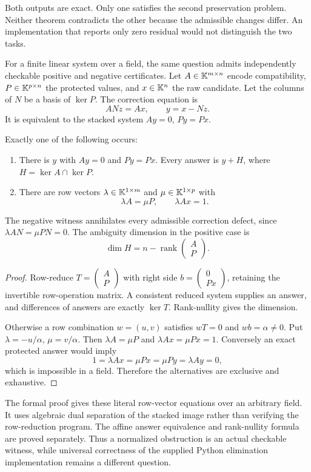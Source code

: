 Both outputs are exact. Only one satisfies the second preservation problem. Neither theorem contradicts the other because the admissible changes differ. An implementation that reports only zero residual would not distinguish the two tasks.

For a finite linear system over a field, the same question admits independently checkable positive and negative certificates. Let \(A\in\mathbb K^{m\times n}\) encode compatibility, \(P\in\mathbb K^{p\times n}\) the protected values, and \(x\in\mathbb K^n\) the raw candidate. Let the columns of \(N\) be a basis of \(\ker P\). The correction equation is
\[
 ANz=Ax,\qquad y=x-Nz.
\]
It is equivalent to the stacked system \(Ay=0\), \(Py=Px\).

\begin{proposition}\label{KS57}
Exactly one of the following occurs:
\begin{enumerate}
\item There is \(y\) with \(Ay=0\) and \(Py=Px\). Every answer is \(y+H\), where \(H=\ker A\cap\ker P\).
\item There are row vectors \(\lambda\in\mathbb K^{1\times m}\) and \(\mu\in\mathbb K^{1\times p}\) with
\[
 \lambda A=\mu P,\qquad\lambda Ax=1.
\]
\end{enumerate}
The negative witness annihilates every admissible correction defect, since \(\lambda AN=\mu PN=0\). The ambiguity dimension in the positive case is
\[
 \dim H=n-\operatorname{rank}\begin{pmatrix}A\\P\end{pmatrix}.
\]
\end{proposition}
\begin{proof}
Row-reduce \(T=\begin{pmatrix}A\\P\end{pmatrix}\) with right side \(b=\begin{pmatrix}0\\Px\end{pmatrix}\), retaining the invertible row-operation matrix. A consistent reduced system supplies an answer, and differences of answers are exactly \(\ker T\). Rank-nullity gives the dimension.

Otherwise a row combination \(w=(u,v)\) satisfies \(wT=0\) and \(wb=\alpha\ne0\). Put \(\lambda=-u/\alpha\), \(\mu=v/\alpha\). Then \(\lambda A=\mu P\) and \(\lambda Ax=\mu Px=1\). Conversely an exact protected answer would imply
\[
 1=\lambda Ax=\mu Px=\mu Py=\lambda Ay=0,
\]
which is impossible in a field. Therefore the alternatives are exclusive and exhaustive.
\end{proof}
The formal proof gives these literal row-vector equations over an arbitrary field. It uses algebraic dual separation of the stacked image rather than verifying the row-reduction program. The affine answer equivalence and rank-nullity formula are proved separately. Thus a normalized obstruction is an actual checkable witness, while universal correctness of the supplied Python elimination implementation remains a different question.

